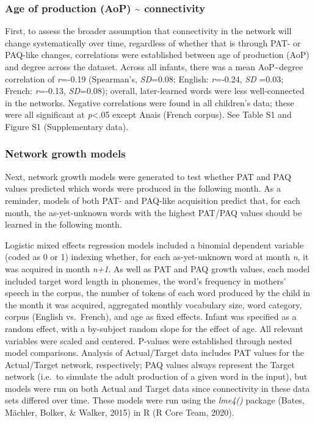 \documentclass[
  man,mask,floatsintext]{apa6}
\begin{document}
\hypertarget{age-of-production-aop-connectivity}{%
\subsubsection{Age of production (AoP) \textasciitilde{} connectivity}\label{age-of-production-aop-connectivity}}

First, to assess the broader assumption that connectivity in the network will change systematically over time, regardless of whether that is through PAT- or PAQ-like changes, correlations were established between age of production (AoP) and degree across the dataset. Across all infants, there was a mean AoP\textasciitilde degree correlation of \emph{r}=-0.19 (Spearman's, \emph{SD}=0.08; English: \emph{r}=-0.24, \emph{SD} =0.03; French: \emph{r}=-0.13, \emph{SD}=0.08); overall, later-learned words were less well-connected in the networks. Negative correlations were found in all children's data; these were all significant at \emph{p}\textless.05 except Anais (French corpus). See Table S1 and Figure S1 (Supplementary data).

\hypertarget{network-growth-models-1}{%
\subsubsection{Network growth models}\label{network-growth-models-1}}

Next, network growth models were generated to test whether PAT and PAQ values predicted which words were produced in the following month. As a reminder, models of both PAT- and PAQ-like acquisition predict that, for each month, the as-yet-unknown words with the highest PAT/PAQ values should be learned in the following month.

Logistic mixed effects regression models included a binomial dependent variable (coded as 0 or 1) indexing whether, for each as-yet-unknown word at month \emph{n}, it was acquired in month \emph{n+1}. As well as PAT and PAQ growth values, each model included target word length in phonemes, the word's frequency in mothers' speech in the corpus, the number of tokens of each word produced by the child in the month it was acquired, aggregated monthly vocabulary size, word category, corpus (English vs.~French), and age as fixed effects. Infant was specified as a random effect, with a by-subject random slope for the effect of age. All relevant variables were scaled and centered. P-values were established through nested model comparisons. Analysis of Actual/Target data includes PAT values for the Actual/Target network, respectively; PAQ values always represent the Target network (i.e.~to simulate the adult production of a given word in the input), but models were run on both Actual and Target data since connectivity in these data sets differed over time. These models were run using the \emph{lme4()} package (Bates, Mächler, Bolker, \& Walker, 2015) in R (R Core Team, 2020).
\end{document}
